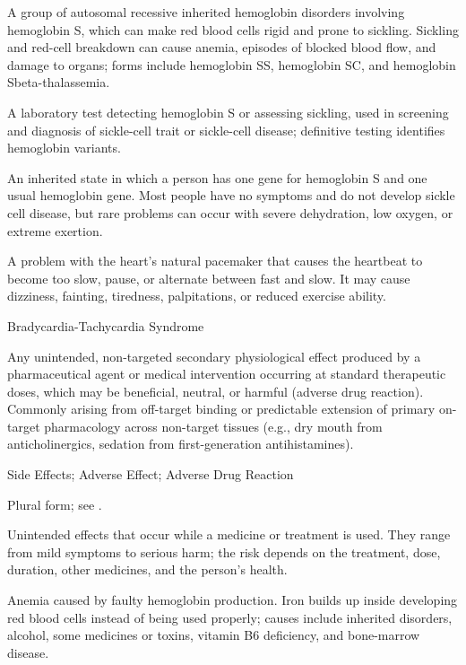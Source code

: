  A group of autosomal recessive inherited hemoglobin disorders involving hemoglobin S, which can make red blood cells rigid and prone to sickling. Sickling and red-cell breakdown can cause anemia, episodes of blocked blood flow, and damage to organs; forms include hemoglobin SS, hemoglobin SC, and hemoglobin S\/beta-thalassemia.

 A laboratory test detecting hemoglobin S or assessing sickling, used in screening and diagnosis of sickle-cell trait or sickle-cell disease; definitive testing identifies hemoglobin variants.

 An inherited state in which a person has one gene for hemoglobin S and one usual hemoglobin gene. Most people have no symptoms and do not develop sickle cell disease, but rare problems can occur with severe dehydration, low oxygen, or extreme exertion.

 A problem with the heart’s natural pacemaker that causes the heartbeat to become too slow, pause, or alternate between fast and slow. It may cause dizziness, fainting, tiredness, palpitations, or reduced exercise ability.

\synonyms
Bradycardia-Tachycardia Syndrome

 Any unintended, non-targeted secondary physiological effect produced by a pharmaceutical agent or medical intervention occurring at standard therapeutic doses, which may be beneficial, neutral, or harmful (adverse drug reaction). Commonly arising from off-target binding or predictable extension of primary on-target pharmacology across non-target tissues (e.g., dry mouth from anticholinergics, sedation from first-generation antihistamines).

\synonyms
Side Effects; Adverse Effect; Adverse Drug Reaction

 Plural form; see .

 Unintended effects that occur while a medicine or treatment is used. They range from mild symptoms to serious harm; the risk depends on the treatment, dose, duration, other medicines, and the person’s health.

 Anemia caused by faulty hemoglobin production. Iron builds up inside developing red blood cells instead of being used properly; causes include inherited disorders, alcohol, some medicines or toxins, vitamin B6 deficiency, and bone-marrow disease.

